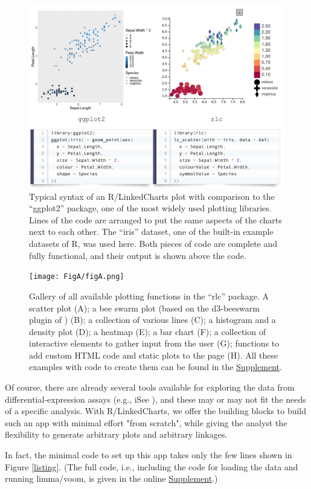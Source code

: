 \documentclass[twocolumn,10pt]{article}
\newcommand{\Supplement}{\href{https://anders-biostat.github.io/lc-paper/}{Supplement}}
\begin{document}
\begin{figure}[t]
	\centering\includegraphics[width=.8\textwidth]{FigB/figB.png}
	\caption{Typical syntax of an R/LinkedCharts plot with comparison to the ``ggplot2'' \citep{wickham_2016} package, one of the most widely used plotting libraries. Lines of the code are arranged to put the same aspects of the charts next to each other. The ``iris'' dataset, one of the built-in example datasets of R, was used here. Both pieces of code are complete and fully functional, and their output is shown above the code.}
	\label{FigB}
\end{figure}



\begin{figure}
	\texttt{[image: FigA/figA.png]}
	\caption{Gallery of all available plotting functions in the ``rlc'' package. A scatter plot (A); a bee swarm plot (based on the d3-beeswarm plugin of \citet{lebeau_2017}) (B); a collection of various lines (C); a histogram and a density plot (D); a heatmap (E); a bar chart (F); a collection of interactive elements to gather input from the user (G); functions to add custom HTML code and static plots to the page (H). All these examples with code to create them can be found in the \Supplement.}
	\label{FigA}
\end{figure}

Of course, there are already several tools available for exploring the data from differential-expression assays (e.g., iSee \cite{rue_2018}), and these may or may not fit the needs of a specific analysis. With R/LinkedCharts, we offer the building blocks to build such an app with minimal effort "from scratch", while giving the analyst the flexibility to generate arbitrary plots and arbitrary linkages.

In fact, the minimal code to set up this app takes only the few lines shown in Figure \ref{listing}. (The full code, i.e., including the code for loading the data and running limma/voom, is given in the online \Supplement.)
\end{document}
